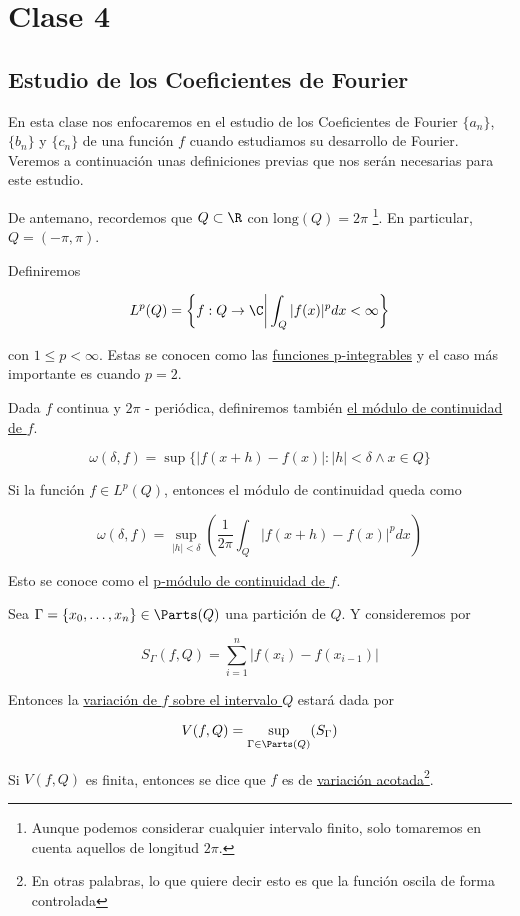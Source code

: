 \section{Clase 4}
\subsection{Estudio de los Coeficientes de Fourier}

En esta clase nos enfocaremos en el estudio de los Coeficientes de Fourier $\{a_n\}$, $\{b_n\}$ y $\{c_n\}$ de una función $f$ cuando estudiamos su desarrollo de Fourier. Veremos a continuación unas definiciones previas que nos serán necesarias para este estudio.

De antemano, recordemos que $Q \subset \R$ con $\mathrm{long}(Q) = 2\pi$ \footnote{Aunque podemos considerar cualquier intervalo finito, solo tomaremos en cuenta aquellos de longitud $2\pi$.}. En particular, $Q = (-\pi, \pi)$.

\begin{defn}
    Definiremos

    \[
        L^p(Q) = \left\{ f: Q \rightarrow \C \bigg| \int_Q |f(x)|^p dx < \infty \right\}  
    \]

    \noindent 
    con $1 \leq p < \infty$. Estas se conocen como las \ul{funciones p-integrables} y el caso más importante es cuando $p = 2$.
\end{defn}

\begin{defn}
    Dada $f$ continua y $2\pi$ - periódica, definiremos también \ul{el módulo de continuidad de $f$}.

    \[
        \omega (\delta, f) = \sup\{ |f(x + h) - f(x)| : |h| < \delta \wedge x \in Q \}
    \]

    Si la función $f \in L^p(Q)$, entonces el módulo de continuidad queda como

    \[
        \omega(\delta, f) = \sup_{|h| < \delta} \left( \displaystyle\frac{1}{2\pi} \int_Q |f(x+h) - f(x)|^p dx \right)
    \]

    Esto se conoce como el \ul{p-módulo de continuidad de $f$}.
\end{defn}

\begin{defn}
    Sea $\Gamma = \{x_0, \dots, x_n\} \in \Parts(Q)$ una partición de $Q$. Y consideremos por

    \[
        S_{\Gamma}(f, Q) = \sum_{i=1}^n \left|f(x_i) - f(x_{i-1})\right|
    \]

    Entonces la \ul{variación de $f$ sobre el intervalo $Q$} estará dada por

    \[
        V(f, Q) = \sup_{\substack{\Gamma \in \Parts(Q)}} (S_{\Gamma})
    \]

    Si $V(f, Q)$ es finita, entonces se dice que $f$ es de \ul{variación acotada}\footnote{En otras palabras, lo que quiere decir esto es que la función oscila de forma controlada}.
\end{defn}

